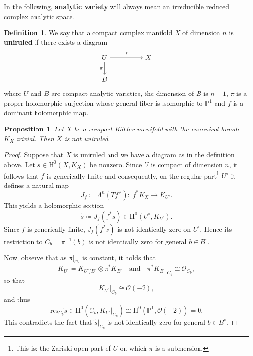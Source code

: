 \documentclass[11pt,a4paper]{article}
\newtheorem{prop}[theorem]{Proposition}
\theoremstyle{definition}
\newtheorem{definition}[theorem]{Definition}
\newcommand{\eand}{\quad \text{and} \quad}
\newcommand{\cO}{\mathcal{O}}
\begin{document}
In the following, \textbf{analytic variety} will always mean an irreducible reduced complex analytic space. 

\begin{definition}
  We say that a compact complex manifold $X$ of dimension $n$ is \textbf{uniruled} if there exists a diagram
  \[\begin{tikzcd}
    U && X \\
    B
    \arrow["f", from=1-1, to=1-3]
    \arrow["\pi"', from=1-1, to=2-1]
  \end{tikzcd}\]
  where $U$ and $B$ are compact analytic varieties, the dimension of $B$ is $n-1$, $\pi$ is a proper holomorphic surjection whose general fiber is isomorphic to $\mathbb{P}^1$ and $f$ is a dominant holomorphic map.
\end{definition}

\begin{prop}
  Let $X$ be a compact Kähler manifold with the canonical bundle $K_X$ trivial. Then $X$ is not uniruled.
\end{prop}

\begin{proof}
  Suppose that $X$ is uniruled and we have a diagram as in the definition above. Let $s\in \mathrm{H}^0(X, K_X)$ be nonzero. Since $U$ is compact of dimension $n$, it follows that $f$ is generically finite and consequently, on the regular part\footnote{This is: the Zariski-open part of $U$ on which $\pi$ is a submersion.} $U^\circ$ it defines a natural map
  \begin{equation*}
    J_f \coloneq \Lambda^n (Tf^\vee): \; f^* K_X \to K_{U^\circ}.
  \end{equation*}
  This yields a holomorphic section
  \begin{equation*}
    \tilde{s} \coloneq J_f (f^* s) \in \mathrm{H}^0(U^\circ, K_{U^\circ}).
  \end{equation*}
  Since $f$ is generically finite, $J_f (f^* s)$ is not identically zero on $U^\circ$. Hence its restriction to $C_b = \pi^{-1}(b)$ is not identically zero for general $b \in B^\circ$.
  
  Now, observe that as $\pi|_{C_b}$ is constant, it holds that
  \begin{equation*}
    K_{U^\circ} = K_{U^\circ/B^\circ} \otimes \pi^*K_{B^\circ}\eand  \pi^* K_{B^\circ}\big|_{C_b} \cong \cO_{C_b},
  \end{equation*}
  so that 
  \begin{equation*}
    K_{U^\circ}\big|_{C_b}  \cong \cO(-2),
  \end{equation*}
  and thus
  \begin{equation*}
    \mathrm{res}_{C_b} \tilde{s} \in \mathrm{H}^0(C_b, K_{U^\circ}\big|_{C_b}) \cong \mathrm{H}^0(\mathbb{P}^1, \cO(-2)) = 0.
  \end{equation*}
  This contradicts the fact that $\tilde{s}|_{C_b}$ is not identically zero for general $b \in B^\circ$.
\end{proof}
\end{document}
